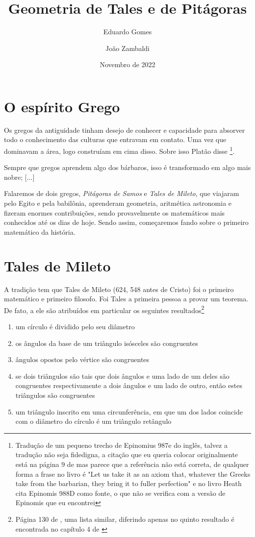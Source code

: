 \documentclass{article}
\title  {Geometria de Tales e de Pitágoras}
\author {Eduardo Gomes \and João Zambaldi}
\date   {Novembro de 2022}
\begin{document}
\maketitle

\section {O espírito Grego} 

Os gregos da antiguidade tinham desejo de conhecer e capacidade
para absorver todo o conhecimento das culturas que entravam em contato.
Uma vez que dominavam a área, logo construíam em cima disso. 
Sobre isso Platão disse \footnote{Tradução de um pequeno trecho de 
Epinomius 987e do inglês, talvez a tradução não seja fidedigna, a 
citação que eu queria colocar originalmente está na página 9 de \cite{Heath} mas 
parece que a referência não está correta, de qualquer forma a frase no
livro é "Let us take it as an axiom that, whatever the Greeks take 
from the barbarian, they bring it to fuller perfection" e no livro 
Heath cita Epinomis 988D como fonte, o que não se verifica com a 
versão de Epinomis que eu encontrei}.

\begin{framed}
	Sempre que gregos aprendem algo dos bárbaros, isso é 
	transformado em algo mais nobre; [...]
\end{framed}

Falaremos de dois gregos, \emph{Pitágoras de Samos} e \emph{Tales de Mileto},
que viajaram pelo Egito e pela babilônia, aprenderam geometria, aritmética
astronomia e fizeram enormes contribuições, sendo provavelmente os matemáticos
mais conhecidos até os dias de hoje. Sendo assim, começaremos fando sobre o primeiro
matemático da história.


\section {Tales de Mileto}

A tradição tem que Tales de Mileto (624, 548 antes de Cristo) foi o primeiro
matemático e primeiro filosofo. Foi Tales a primeira pessoa a provar um teorema.
De fato, a ele são atribuídos em particular os seguintes resultados\footnote{
Página 130 de \cite{Heath}, uma lista similar, diferindo apenas no quinto resultado
é encontrada no capítulo 4 de \cite{Boyer}}
\begin{enumerate}
	\item um círculo é dividido pelo seu diâmetro
	\item os ângulos da base de um triângulo isósceles são congruentes
	\item ângulos opostos pelo vértice são congruentes
	\item se dois triângulos são tais que dois ângulos e uma lado de um deles são
		congruentes respectivamente a dois ângulos e um lado de outro, então
		estes triângulos são congruentes
	\item um triângulo inscrito em uma circunferência, em que um dos lados
		coincide com o diâmetro do círculo é um triângulo retângulo
\end{enumerate}
\end{document}
